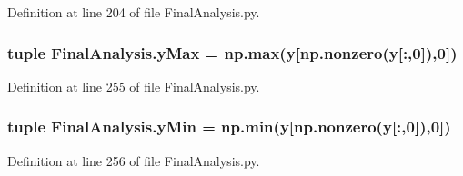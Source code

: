 Definition at line 204 of file Final\-Analysis.\-py.

\hypertarget{namespace_final_analysis_a7071cf368ec253b5f7165fa535e161ef}{
\subsubsection[{y\-Max}]{\setlength{\rightskip}{0pt plus 5cm}tuple Final\-Analysis.\-y\-Max = np.\-max({\bf y}\mbox{[}np.\-nonzero({\bf y}\mbox{[}\-:,0\mbox{]}),0\mbox{]})}}\label{namespace_final_analysis_a7071cf368ec253b5f7165fa535e161ef}


Definition at line 255 of file Final\-Analysis.\-py.

\hypertarget{namespace_final_analysis_a542cfbfe4821ac9a631cbe8102ad7de6}{
\subsubsection[{y\-Min}]{\setlength{\rightskip}{0pt plus 5cm}tuple Final\-Analysis.\-y\-Min = np.\-min({\bf y}\mbox{[}np.\-nonzero({\bf y}\mbox{[}\-:,0\mbox{]}),0\mbox{]})}}\label{namespace_final_analysis_a542cfbfe4821ac9a631cbe8102ad7de6}


Definition at line 256 of file Final\-Analysis.\-py.

